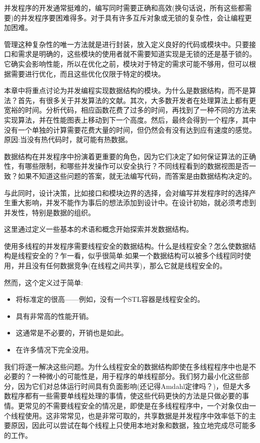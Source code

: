 
并发程序的开发通常挺难的，编写同时需要正确和高效(换句话说，所有这些都需要)的并发程序要困难得多。对于具有许多互斥对象或无锁的复杂性，会让编程更加困难。

管理这种复杂性的唯一方法就是进行封装，放入定义良好的代码或模块中。只要接口和需求是明确的，这些模块的使用者就不需要知道实现是无锁的还是基于锁的。它确实会影响性能，所以在优化之前，模块对于特定的需求可能不够用，但可以根据需要进行优化，而且这些优化仅限于特定的模块。

本章中将重点讨论为并发编程实现数据结构的模块。为什么是数据结构，而不是算法？首先，有很多关于并发算法的文献。其次，大多数开发者在处理算法上都有更宽裕的时间。分析代码，相应函数花费了过多的时间，再找到了一种不同的方法来实现算法，并在性能图表上移动到下一个高度。然后，最终会得到一个程序，其中没有一个单独的计算需要花费大量的时间，但仍然会有没有达到应有速度的感觉。原因:当没有热代码时，就可能有热数据。

数据结构在并发程序中扮演着更重要的角色，因为它们决定了如何保证算法的正确性，有哪些限制，和哪些并发操作可以安全执行？不同线程看到的数据视图是否一致？如果不知道这些问题的答案，就无法编写代码，而答案是由数据结构决定的。

与此同时，设计决策，比如接口和模块边界的选择，会对编写并发程序时的选择产生重大影响，并发不能作为事后的想法添加到设计中。在设计初始，就必须考虑到并发性，特别是数据的组织。

这里通过定义一些基本的术语和概念开始探索并发数据结构。


使用多线程的并发程序需要线程安全的数据结构。什么是线程安全？怎么使数据结构是线程安全的？乍一看，似乎很简单:如果一个数据结构可以被多个线程同时使用，并且没有任何数据竞争(在线程之间共享)，那么它就是线程安全的。

然而，这个定义过于简单:

\begin{itemize}
\item 将标准定的很高——例如，没有一个STL容器是线程安全的。
\item 具有非常高的性能开销。
\item 这通常是不必要的，开销也是如此。
\item 在许多情况下完全没用。
\end{itemize}

我们将逐一解决这些问题。为什么线程安全的数据结构即使在多线程程序中也是不必要的？一种微小的可能性是，用于程序的单线程部分。我们努力最小化这些部分，因为它们对总体运行时间具有负面影响(还记得Amdahl定律吗？)，但是大多数程序都有一些需要单线程处理的事情，使这些代码更快的方法是只做必要的事情。更常见的不需要线程安全的情况是，即使是在多线程程序中，一个对象仅由一个线程使用。这非常常见，也是非常可取的，共享数据是并发程序中效率低下的主要原因，因此可以尝试在每个线程上只使用本地对象和数据，独立地完成尽可能多的工作。


